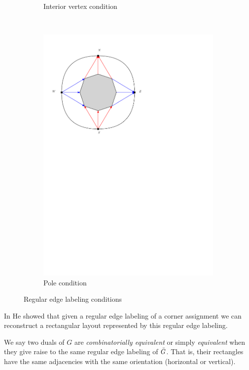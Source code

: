\begin{figure}
\begin{subfigure}[b]{0.2 \textwidth}
          \caption{Interior vertex condition}
      \end{subfigure}
      ~
      \begin{subfigure}[b]{0.7 \textwidth}
          \includegraphics[width =\textwidth]{rectangularDuals/img/exteriorCondition.pdf}
          \caption{Pole condition}
      \end{subfigure}
      \caption{Regular edge labeling conditions}
  \label{fig:rel:conditions}
  \end{figure}
  In \cite{He1993} He showed that given a regular edge labeling of a corner assignment we can reconstruct a rectangular layout represented by this regular edge labeling.

    We say two duals of $G$ are  \emph{combinatorially equivalent} or simply \emph{equivalent} when they give raise to the same regular edge labeling of $\bar{G}$. That is, their rectangles have the same adjacencies with the same orientation (horizontal or vertical).

